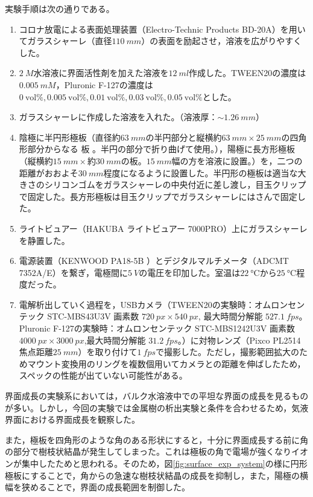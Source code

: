 \documentclass[autodetect-engine,dvi=dvipdfmx,a4paper,ja=standard,oneside,openany,11pt]{bxjsbook}
\begin{document}
実験手順は次の通りである。
\begin{enumerate}
  \item コロナ放電による表面処理装置（Electro-Technic Products BD-20A）を用いてガラスシャーレ（直径$\SI{110}{mm}$）の表面を励起させ，溶液を広がりやすくした。
  \item  {} $\SI{2}{M}$水溶液に界面活性剤を加えた溶液を$\SI{12}{ml}$作成した。TWEEN20の濃度は$\SI{0.005}{mM}$，Pluronic F-127の濃度は$\SI{0}{\mathrm{vol}\%}, \SI{0.005}{\mathrm{vol}\%}, \SI{0.01}{\mathrm{vol}\%}, \SI{0.03}{\mathrm{vol}\%}, \SI{0.05}{\mathrm{vol}\%}$とした。
  \item ガラスシャーレに作成した溶液を入れた。（溶液厚：$\sim\SI{1.26}{mm}$）
  \item 陰極に半円形極板（直径約$\SI{63}{mm}$の半円部分と縦横約$\SI{63}{mm}\times \SI{25}{mm}$の四角形部分からなる 板 。半円の部分で折り曲げて使用。），陽極に長方形極板（縦横約$\SI{15}{mm}\times$約$\SI{30}{mm}$の板。$\SI{15}{mm}$幅の方を溶液に設置。）を，二つの距離がおおよそ$\SI{30}{mm}$程度になるように設置した。半円形の極板は適当な大きさのシリコンゴムをガラスシャーレの中央付近に差し渡し，目玉クリップで固定した。長方形極板は目玉クリップでガラスシャーレにはさんで固定した。
  \item ライトビュアー（HAKUBA ライトビュアー 7000PRO）上にガラスシャーレを静置した。
  \item 電源装置（KENWOOD PA18-5B ）とデジタルマルチメータ（ADCMT 7352A/E）を繋ぎ，電極間に$\SI{5}{V}$の電圧を印加した。室温は$\SI{22}{\degreeCelsius}$から$\SI{25}{\degreeCelsius}$程度だった。
  \item 電解析出していく過程を，USBカメラ（TWEEN20の実験時：オムロンセンテック STC-MBS43U3V 画素数 $\SI{720}{px} \times \SI{540}{px}$, 最大時間分解能 $\SI{527.1}{fps}$。Pluronic F-127の実験時：オムロンセンテック STC-MBS1242U3V 画素数 $\SI{4000}{px} \times \SI{3000}{px}$,最大時間分解能 $\SI{31.2}{fps}$。）に対物レンズ（Pixco PL2514 焦点距離$\SI{25}{mm}$）を取り付けて$\SI{1}{fps}$で撮影した。ただし，撮影範囲拡大のためマウント変換用のリングを複数個用いてカメラとの距離を伸ばしたため，スペックの性能が出ていない可能性がある。
\end{enumerate}

界面成長の実験系においては，バルク水溶液中での平坦な界面の成長を見るものが多い\cite{schilardi1998evolution}。しかし，今回の実験では金属樹の析出実験と条件を合わせるため，気液界面における界面成長を観察した。

また，極板を四角形のような角のある形状にすると，十分に界面成長する前に角の部分で樹枝状結晶が発生してしまった。これは極板の角で電場が強くなりイオンが集中したためと思われる。そのため，図\ref{fig:surface_exp_system}の様に円形極板にすることで，角からの急速な樹枝状結晶の成長を抑制し，また，陽極の横幅を狭めることで，界面の成長範囲を制御した。
\end{document}
